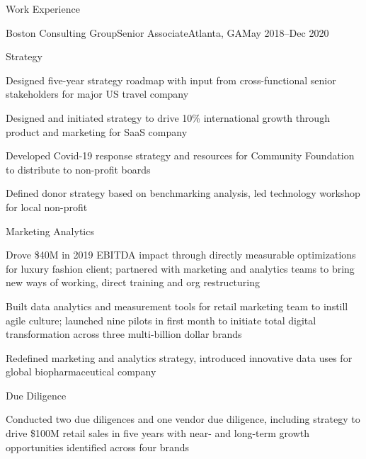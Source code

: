 \documentclass{resume_v3} %
\begin{document}
\printname
\printaddressline

\vspace{0.3em}
\begin{rSection}{Work Experience}

\begin{mainTitle}{Boston Consulting Group}{Senior Associate}{Atlanta, GA}{May 2018–Dec 2020}
\end{mainTitle}
\vspace{-0.5em}
\begin{bulletGroup}{Strategy}
\item Designed five-year strategy roadmap with input from cross-functional senior stakeholders for major US travel company
\item Designed and initiated strategy to drive 10\% international growth through product and marketing for SaaS company
\item Developed Covid-19 response strategy and resources for Community Foundation to distribute to non-profit boards
\item Defined donor strategy based on benchmarking analysis, led technology workshop for local non-profit
\end{bulletGroup}
\vspace{-0.2em}
\begin{bulletGroup}{Marketing Analytics}
\item Drove \$40M in 2019 EBITDA impact through directly measurable optimizations for luxury fashion client; partnered with marketing and analytics teams to bring new ways of working, direct training and org restructuring
\item Built data analytics and measurement tools for retail marketing team to instill agile culture; launched nine pilots in first month to initiate total digital transformation across three multi-billion dollar brands
\item Redefined marketing and analytics strategy, introduced innovative data uses for global biopharmaceutical company
\end{bulletGroup}
\vspace{-0.2em}
\begin{bulletGroup}{Due Diligence}
\item Conducted two due diligences and one vendor due diligence, including strategy to drive \$100M retail sales in five years with near- and long-term growth opportunities identified across four brands

\end{bulletGroup}
\end{rSection}
\end{document}
